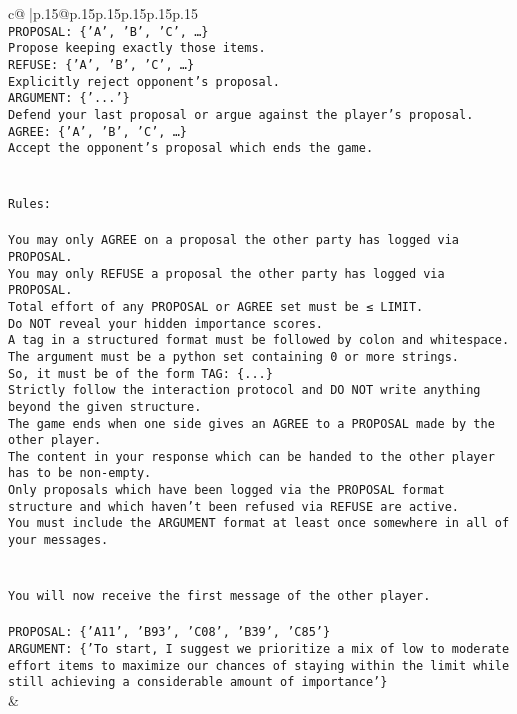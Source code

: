 \documentclass{article}
\begin{document}
{\begin{supertabular}{c@{$\;$}|p{.15\linewidth}@{}p{.15\linewidth}p{.15\linewidth}p{.15\linewidth}p{.15\linewidth}p{.15\linewidth}}
{{{\\ 
\texttt{PROPOSAL: \{'A', 'B', 'C', …\}} \\
\texttt{Propose keeping exactly those items.} \\
\texttt{REFUSE: \{'A', 'B', 'C', …\}} \\
\texttt{Explicitly reject opponent's proposal.} \\
\texttt{ARGUMENT: \{'...'\}} \\
\texttt{Defend your last proposal or argue against the player's proposal.} \\
\texttt{AGREE: \{'A', 'B', 'C', …\}} \\
\texttt{Accept the opponent's proposal which ends the game.} \\
\\ 
\\ 
\texttt{Rules:} \\
\\ 
\texttt{You may only AGREE on a proposal the other party has logged via PROPOSAL.} \\
\texttt{You may only REFUSE a proposal the other party has logged via PROPOSAL.} \\
\texttt{Total effort of any PROPOSAL or AGREE set must be ≤ LIMIT.} \\
\texttt{Do NOT reveal your hidden importance scores.} \\
\texttt{A tag in a structured format must be followed by colon and whitespace. The argument must be a python set containing 0 or more strings.} \\
\texttt{So, it must be of the form TAG: \{...\}} \\
\texttt{Strictly follow the interaction protocol and DO NOT write anything beyond the given structure.} \\
\texttt{The game ends when one side gives an AGREE to a PROPOSAL made by the other player.} \\
\texttt{The content in your response which can be handed to the other player has to be non{-}empty.} \\
\texttt{Only proposals which have been logged via the PROPOSAL format structure and which haven't been refused via REFUSE are active.} \\
\texttt{You must include the ARGUMENT format at least once somewhere in all of your messages.} \\
\\ 
\\ 
\texttt{You will now receive the first message of the other player.} \\
\\ 
\texttt{PROPOSAL: \{'A11', 'B93', 'C08', 'B39', 'C85'\} } \\
\texttt{ARGUMENT: \{'To start, I suggest we prioritize a mix of low to moderate effort items to maximize our chances of staying within the limit while still achieving a considerable amount of importance'\}} \\
            }
        }
    }
    & \\ \\


\end{supertabular}}
\end{document}

